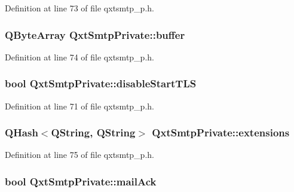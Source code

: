 Definition at line 73 of file qxtsmtp\-\_\-p.\-h.

\hypertarget{class_qxt_smtp_private_a896f826c5d859de186f7d6bdea4d7252}{
\subsubsection[{buffer}]{\setlength{\rightskip}{0pt plus 5cm}Q\-Byte\-Array Qxt\-Smtp\-Private\-::buffer}}\label{class_qxt_smtp_private_a896f826c5d859de186f7d6bdea4d7252}


Definition at line 74 of file qxtsmtp\-\_\-p.\-h.

\hypertarget{class_qxt_smtp_private_a21526a7620fa2ad702fcfdde56fe7c1b}{
\subsubsection[{disable\-Start\-T\-L\-S}]{\setlength{\rightskip}{0pt plus 5cm}bool Qxt\-Smtp\-Private\-::disable\-Start\-T\-L\-S}}\label{class_qxt_smtp_private_a21526a7620fa2ad702fcfdde56fe7c1b}


Definition at line 71 of file qxtsmtp\-\_\-p.\-h.

\hypertarget{class_qxt_smtp_private_af132a9647690d51eb59b8afddb10a2c7}{
\subsubsection[{extensions}]{\setlength{\rightskip}{0pt plus 5cm}Q\-Hash$<${\bf Q\-String}, {\bf Q\-String}$>$ Qxt\-Smtp\-Private\-::extensions}}\label{class_qxt_smtp_private_af132a9647690d51eb59b8afddb10a2c7}


Definition at line 75 of file qxtsmtp\-\_\-p.\-h.

\hypertarget{class_qxt_smtp_private_a177d60fd3b1d4e84eba7c981f356d623}{
\subsubsection[{mail\-Ack}]{\setlength{\rightskip}{0pt plus 5cm}bool Qxt\-Smtp\-Private\-::mail\-Ack}}\label{class_qxt_smtp_private_a177d60fd3b1d4e84eba7c981f356d623}


